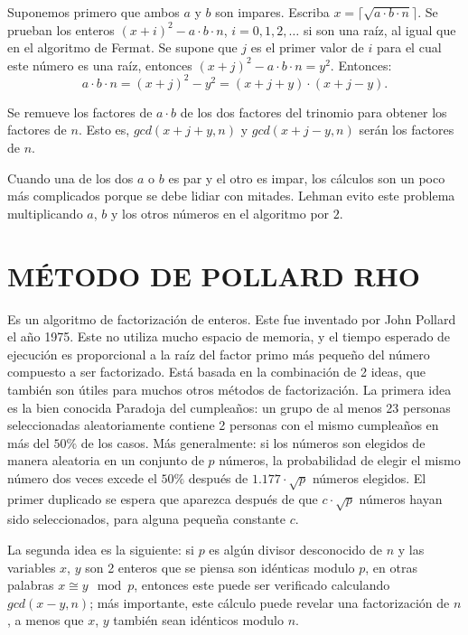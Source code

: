 \documentclass[12pt,letterpaper]{book}
\begin{document}
    Suponemos primero que ambos $a$ y $b$ son impares. Escriba $x=\lceil\sqrt{a\cdot b \cdot n}\rceil$. Se prueban los enteros $(x+i)^{2} - a\cdot b \cdot n$, $i=0, 1, 2, \dots$ si son una raíz, al igual que en el algoritmo de Fermat. Se supone que $j$ es el primer valor de $i$ para el cual este número es una raíz, entonces $(x + j)^{2} - a \cdot b \cdot n = y^{2}$.
    Entonces:
    \[
        a \cdot b \cdot n = (x + j)^{2} - y^{2} = (x + j +y)\cdot(x + j - y).
    \]

    Se remueve los factores de $a\cdot b$ de los dos factores del trinomio para obtener los factores de $n$. Esto es, $gcd(x + j + y, n)$ y $gcd(x + j - y, n)$ serán los factores de $n$.

    Cuando una de los dos $a$ o $b$ es par y el otro es impar, los cálculos son un poco más complicados porque se debe lidiar con mitades. Lehman evito este problema multiplicando $a$, $b$ y los otros números en el algoritmo por $2$.
    
    \section{MÉTODO DE POLLARD RHO}
    Es un algoritmo de factorización de enteros. Este fue inventado por John Pollard el año 1975. Este no utiliza mucho espacio de memoria, y el tiempo esperado de ejecución es proporcional a la raíz del factor primo más pequeño del número compuesto a ser factorizado. Está basada en la combinación de 2 ideas, que también son útiles para muchos otros métodos de factorización. La primera idea es la bien conocida Paradoja del cumpleaños: un grupo de al menos 23 personas seleccionadas aleatoriamente contiene 2 personas con el mismo cumpleaños en más del $50\%$ de los casos. Más generalmente: si los números son elegidos de manera aleatoria en un conjunto de $p$ números, la probabilidad de elegir el mismo número dos veces excede el $50\%$ después de $1.177\cdot\sqrt{p}$ números elegidos. El primer duplicado se espera que aparezca después de que $c\cdot\sqrt{p}$ números hayan sido seleccionados, para alguna pequeña constante $c$.

    La segunda idea es la siguiente: si $p$ es algún divisor desconocido de $n$ y las variables $x$, $y$ son 2 enteros que se piensa son idénticas modulo $p$, en otras palabras $x \cong y \mod p$, entonces este puede ser verificado calculando $gcd(x - y, n)$; más importante, este cálculo puede revelar una factorización de $n$, a menos que $x$, $y$ también sean idénticos modulo $n$.
\end{document}
